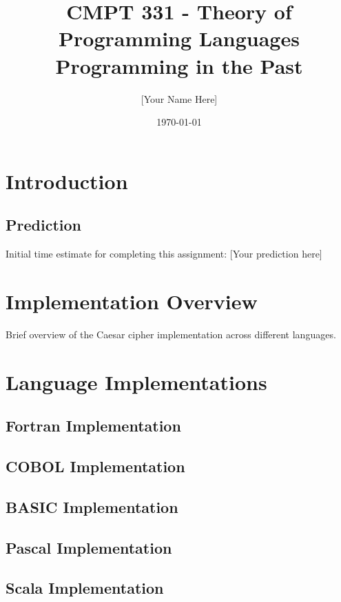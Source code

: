 \documentclass[12pt]{article}
\title{CMPT 331 - Theory of Programming Languages\\
Programming in the Past}
\author{[Your Name Here]\\
[Your Email]}
\date{\today}
\begin{document}
\maketitle

\section{Introduction}
\subsection{Prediction}
Initial time estimate for completing this assignment: [Your prediction here]

\section{Implementation Overview}
Brief overview of the Caesar cipher implementation across different languages.

\section{Language Implementations}
\subsection{Fortran Implementation}


\subsection{COBOL Implementation}


\subsection{BASIC Implementation}


\subsection{Pascal Implementation}


\subsection{Scala Implementation}

\end{document}
